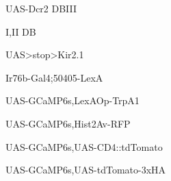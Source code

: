 \documentclass[17pt]{extarticle}
\begin{document}
\newpage{}
\vspace*{\fill}\begin{normalsize}
UAS-Dcr2 DBIII \\[0.5em]
\end{normalsize}
\footnotesize
\vspace*{\fill}
\newpage{}
\vspace*{\fill}\begin{large}
I,II DB \\[0.5em]
\end{large}
\footnotesize
\vspace*{\fill}
\newpage{}
\vspace*{\fill}\begin{normalsize}
UAS>stop>Kir2.1 \\[0.5em]
\end{normalsize}
\footnotesize
\vspace*{\fill}
\newpage{}
\vspace*{\fill}\begin{footnotesize}
Ir76b-Gal4;50405-LexA \\[0.5em]
\end{footnotesize}
\footnotesize
\vspace*{\fill}
\newpage{}
\vspace*{\fill}\begin{footnotesize}
UAS-GCaMP6s,LexAOp-TrpA1 \\[0.5em]
\end{footnotesize}
\footnotesize
\vspace*{\fill}
\newpage{}
\vspace*{\fill}\begin{footnotesize}
UAS-GCaMP6s,Hist2Av-RFP \\[0.5em]
\end{footnotesize}
\footnotesize
\vspace*{\fill}
\newpage{}
\vspace*{\fill}\begin{footnotesize}
UAS-GCaMP6s,UAS-CD4::tdTomato \\[0.5em]
\end{footnotesize}
\footnotesize
\vspace*{\fill}
\newpage{}
\vspace*{\fill}\begin{footnotesize}
UAS-GCaMP6s,UAS-tdTomato-3xHA \\[0.5em]
\end{footnotesize}
\footnotesize
\end{document}
